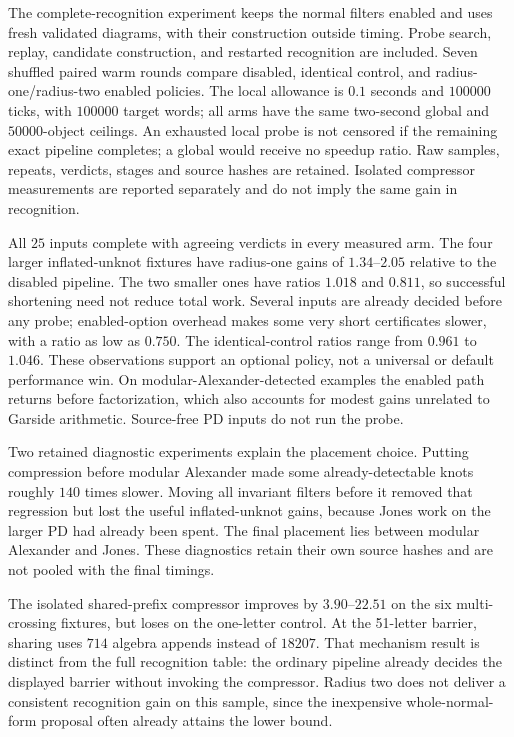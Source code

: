 

The complete-recognition experiment keeps the normal filters enabled and
uses fresh validated diagrams, with their construction outside timing.
Probe search, replay, candidate construction, and restarted recognition are
included.  Seven shuffled paired warm rounds compare disabled, identical
control, and radius-one/radius-two enabled policies.  The local allowance is
$0.1$ seconds and $100000$ ticks, with $100000$ target words; all arms have
the same two-second global and $50000$-object ceilings.  An exhausted local
probe is not censored if the remaining exact pipeline completes; a global
 would receive no speedup ratio.  Raw samples, repeats,
verdicts, stages and source hashes are retained.  Isolated compressor
measurements are reported separately and do not imply the same gain in
recognition.


All $25$ inputs complete with agreeing verdicts in every measured arm.  The
four larger inflated-unknot fixtures have radius-one gains of $1.34$--$2.05$
relative to the disabled pipeline.  The two smaller ones have ratios $1.018$
and $0.811$, so successful shortening need not reduce total work.  Several
inputs are already decided before any probe; enabled-option overhead makes
some very short certificates slower, with a ratio as low as $0.750$.  The
identical-control ratios range from $0.961$ to $1.046$.  These observations
support an optional policy, not a universal or default performance win.
On modular-Alexander-detected examples the enabled path returns before
factorization, which also accounts for modest gains unrelated to Garside
arithmetic.  Source-free PD inputs do not run the probe.

Two retained diagnostic experiments explain the placement choice.  Putting
compression before modular Alexander made some already-detectable knots
roughly $140$ times slower.  Moving all invariant filters before it removed
that regression but lost the useful inflated-unknot gains, because Jones
work on the larger PD had already been spent.  The final placement lies
between modular Alexander and Jones.  These diagnostics retain their own
source hashes and are not pooled with the final timings.

The isolated shared-prefix compressor improves by $3.90$--$22.51$ on the
six multi-crossing fixtures, but loses on the one-letter control.  At the
51-letter barrier, sharing uses $714$ algebra appends instead of $18207$.
That mechanism result is distinct from the full recognition table: the
ordinary pipeline already decides the displayed barrier without invoking
the compressor.  Radius two does not deliver a consistent recognition gain
on this sample, since the inexpensive whole-normal-form proposal often
already attains the lower bound.
